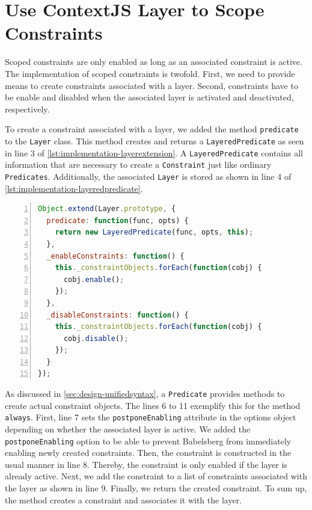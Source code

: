 \section{Use ContextJS Layer to Scope Constraints}
Scoped constraints are only enabled as long as an associated constraint is active. The implementation of scoped constraints is twofold. First, we need to provide means to create constraints associated with a layer. Second, constraints have to be enable and disabled when the associated layer is activated and deactivated, respectively.

To create a constraint associated with a layer, we added the method \texttt{predicate} to the \texttt{Layer} class. This method creates and returns a \texttt{LayeredPredicate} as seen in line 3 of \autoref{lst:implementation-layerextension}.
A \texttt{LayeredPredicate} contains all information that are necessary to create a \texttt{Constraint} just like ordinary \texttt{Predicates}. Additionally, the associated \texttt{Layer} is stored as shown in line 4 of \autoref{lst:implementation-layeredpredicate}.

\begin{lstlisting}[label=lst:implementation-layerextension,caption={Extention of the ContextJS \texttt{Layer} class},float,numbers=left,language=JavaScript,morekeywords={always}]
Object.extend(Layer.prototype, {
  predicate: function(func, opts) {
    return new LayeredPredicate(func, opts, this);
  },
  _enableConstraints: function() {
    this._constraintObjects.forEach(function(cobj) {
      cobj.enable();
    });
  },
  _disableConstraints: function() {
    this._constraintObjects.forEach(function(cobj) {
      cobj.disable();
    });
  }
});
\end{lstlisting}

As discussed in \autoref{sec:design-unifiedsyntax}, a \texttt{Predicate} provides methods to create actual constraint objects. The lines 6 to 11 exemplify this for the method \texttt{always}. 
First, line 7 sets the \texttt{postponeEnabling} attribute in the options object depending on whether the associated layer is active. We added the \texttt{postponeEnabling} option to be able to prevent Babelsberg from immediately enabling newly created constraints.
Then, the constraint is constructed in the usual manner in line 8. Thereby, the constraint is only enabled if the layer is already active.
Next, we add the constraint to a list of constraints associated with the layer as shown in line 9. Finally, we return the created constraint.
To sum up, the method creates a constraint and associates it with the layer.

